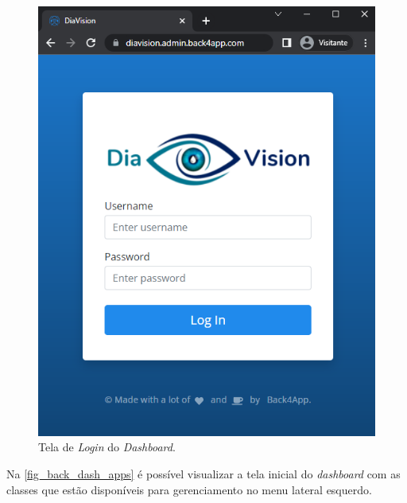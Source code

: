\begin{figure}[htb]
    \caption{\label{fig_back_dash_auth}Tela de \emph{Login} do \emph{Dashboard}.}
    \begin{center}
        \includegraphics[scale=0.55]{Imagens/desenvolvimento/auth_admin.png}
    \end{center}
\end{figure}

\newpage

Na \autoref{fig_back_dash_apps} é possível visualizar a tela inicial do \emph{dashboard} com as classes
que estão disponíveis para gerenciamento no menu lateral esquerdo.

